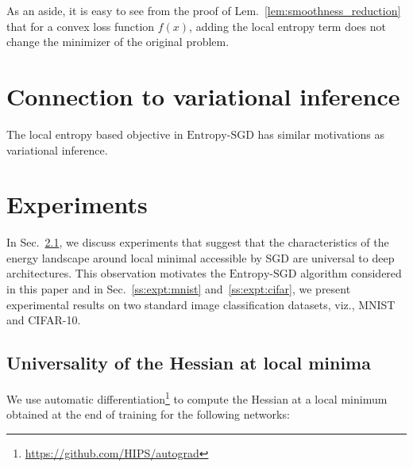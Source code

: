 \documentclass[10pt]{article}
\newcommand{\entropysgd}{\mathrm{Entropy}\textrm{-}\mathrm{SGD}}
\begin{document}
As an aside, it is easy to see from the proof of Lem.~\ref{lem:smoothness_reduction} that for a convex loss function $f(x)$, adding the local entropy term does not change the minimizer of the original problem.


\section{Connection to variational inference}
\label{s:app:connection_variational}
The local entropy based objective in $\entropysgd$ has similar motivations as variational inference.


\section{Experiments}
\label{s:expt}

In Sec.~\ref{ss:expt:universality}, we discuss experiments that suggest that the characteristics of the energy landscape around local minimal accessible by SGD are universal to deep architectures.  This observation motivates the $\entropysgd$ algorithm considered in this paper and in Sec.~\ref{ss:expt:mnist} and~\ref{ss:expt:cifar}, we present experimental results on two standard image classification datasets, viz., MNIST and CIFAR-10.

\subsection{Universality of the Hessian at local minima}
\label{ss:expt:universality}

We use automatic differentiation\footnote{\href{https://github.com/HIPS/autograd}{https://github.com/HIPS/autograd}} to compute the Hessian at a local minimum obtained at the end of training for the following networks:
\end{document}
